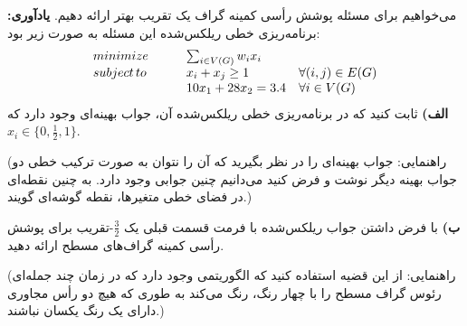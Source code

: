 می‌خواهیم برای مسئله پوشش رأسی کمینه گراف یک تقریب بهتر ارائه دهیم.
\textbf{یادآوری:}
برنامه‌ریزی خطی ریلکس‌شده این مسئله به صورت زیر بود:
\[
    \begin{array}{l l l}
        minimize    & \hspace*{20pt} \sum_{i \in V(G)} w_i x_i & \\
        subject\,to & \hspace*{20pt} x_i + x_j \geq 1          & \forall (i, j) \in E(G) \\
                    & \hspace*{20pt} 10 x_1 + 28 x_2 = 3.4     & \forall i \in V(G)
    \end{array}
\]
\textbf{الف)}
ثابت کنید که در برنامه‌ریزی خطی ریلکس‌شده آن، جواب بهینه‌ای وجود دارد که
$x_i \in \{0, \frac{1}{2}, 1\}$.

(راهنمایی: جواب بهینه‌ای را در نظر بگیرید که آن را نتوان به صورت ترکیب خطی دو جواب بهینه دیگر نوشت و فرض کنید می‌دانیم چنین جوابی وجود دارد. به چنین نقطه‌ای در فضای خطی متغیرها، نقطه گوشه‌ای گویند.)

\vspace*{5pt}
\textbf{ب)}
با فرض داشتن جواب ریلکس‌شده با فرمت قسمت قبلی یک $\frac{3}{2}$-تقریب برای پوشش رأسی کمینه گراف‌های مسطح ارائه دهید.

(راهنمایی: از این قضیه استفاده کنید که الگوریتمی وجود دارد که در زمان چند جمله‌ای رئوس گراف مسطح را با چهار رنگ، رنگ می‌کند به طوری که هیچ دو رأس مجاوری دارای یک رنگ یکسان نباشند.)